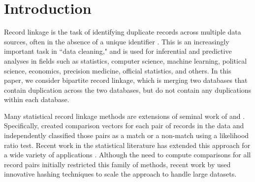 \documentclass[12pt,letterpaper]{article}
\newcommand{\1}[1]{\mathbb{I}\!\left[#1\right]} %
\def\spacingset#1{\renewcommand{\baselinestretch}%
  {#1}\small\normalsize} \spacingset{1}
\begin{document}
\newpage
\spacingset{1.5}

\section{Introduction}
\label{sec:introduction}

{
	\color{blue}
	
%	
%	
%	
	

	
	Record linkage is the task of identifying duplicate records across multiple data sources, often in the absence of a unique identifier \citep{christen_2012}. This is an increasingly important task in ``data cleaning," and is used for inferential and predictive analyses in fields such as statistics, computer science, machine learning, political science, economics, precision medicine, official statistics, and others. In this paper, we consider bipartite record linkage, which is merging two databases that contain duplication across the two databases, but do not contain any duplications within each database. 
	
	
	Many statistical record linkage methods are extensions of seminal work of \cite{fellegi_theory_1969} and \cite{newcombe_automatic_1959}. Specifically, \cite{fellegi_theory_1969} created comparison vectors for each pair of records in the data and independently classified those pairs as a match or a non-match using a likelihood ratio test. Recent work in the statistical literature has extended this approach for a wide variety of applications \citep{winkler1991application, fair2004generalized, wagner2014person, gill2003english}. Although the need to compute comparisons for all record pairs initially restricted this family of methods, recent work by \cite{enamorado2019using} used innovative hashing techniques to scale the approach to handle large datasets.
	
}
\end{document}
